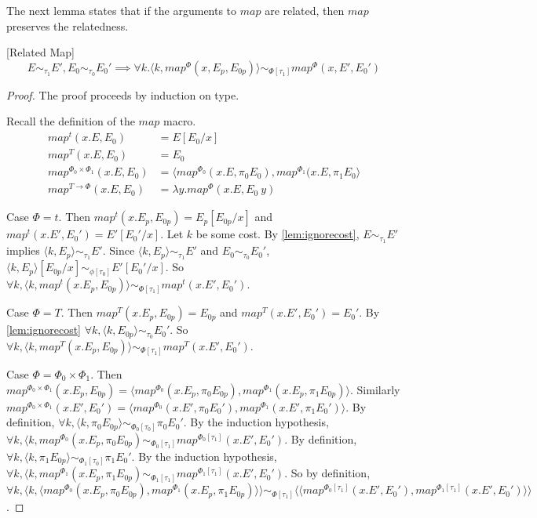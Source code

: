 The next lemma states that if the arguments to $map$ are related, then $map$ preserves the relatedness.
\begin{lemma}
  \label{lem:relatedmap}[Related Map]
  \[ E \sim_{\tau_1} E', E_0 \sim_{\tau_0} E_0' \implies \forall k. \langle k, map^\Phi(x, E_p, E_{0p})\rangle \sim_{\Phi[\tau_1]} map^\Phi(x, E', E_0') \]
\end{lemma}
\begin{proof}
  The proof proceeds by induction on type.

  Recall the definition of the $map$ macro.
  \begin{align*}
    map^t(x.E, E_0) &= E[E_0/x]                                                                                       \\
    map^T(x.E, E_0) &= E_0                                                                                            \\ 
    map^{\Phi_0 \times \Phi_1}(x.E, E_0) &= \langle map^{\Phi_0}(x.E, \pi_0 E_0), map^{\Phi_1}(x.E, \pi_1 E_0 \rangle \\
    map^{T \to \Phi}(x.E, E_0) &= \lambda y.map^\Phi(x.E, E_0\ y)
  \end{align*}

  Case $\Phi = t$.
  Then $map^t(x.E_p, E_{0p}) = E_p[E_{0p}/x]$ and $map^t(x.E', E_0') = E'[E_0'/x]$.
  Let $k$ be some cost.
  By \ref{lem:ignorecost}, $E \sim_{\tau_1} E'$ implies $\langle k, E_p \rangle \sim_{\tau_1} E'$.
  Since $\langle k, E_p \rangle \sim_{\tau_1} E'$ and $E_0 \sim_{\tau_0} E_0'$, $\langle k, E_p \rangle [E_{0p}/x] \sim_{\phi[\tau_0]} E'[E_0'/x]$.
  So $\forall k, \langle k, map^t(x.E_p, E_{0p}) \rangle \sim_{\Phi[\tau_1]} map^t(x.E', E_0')$.

  Case $\Phi = T$.
  Then $map^T(x.E_p, E_{0p}) = E_{0p}$ and $map^T(x.E', E_0') = E_0'$.
  By \ref{lem:ignorecost} $\forall k, \langle k, E_{0p} \rangle \sim_{\tau_0} E_0'$.
  So $\forall k, \langle k, map^T(x.E_p, E_{0p}) \rangle \sim_{\Phi[\tau_1]} map^T(x.E', E_0')$.

  Case $\Phi = \Phi_0 \times \Phi_1$.
  Then $map^{\Phi_0 \times \Phi_1}(x. E_p, E_{0p}) = \langle map^{\Phi_0}(x. E_p, \pi_0 E_{0p}), map^{\Phi_1}(x. E_p, \pi_1 E_{0p}) \rangle$.
  Similarly $map^{\Phi_0 \times \Phi_1}(x. E', E_0') = \langle map^{\Phi_0}(x. E', \pi_0 E_0'), map^{\Phi_1}(x. E', \pi_1 E_0') \rangle$.
  By definition, $\forall k, \langle k, \pi_0 E_{0p} \rangle \sim_{\Phi_0[\tau_0]} \pi_0 E_0'$.
  By the induction hypothesis, $\forall k, \langle k, map^{\Phi_0}(x. E_p, \pi_0 E_{0p}) \sim_{\Phi_0[\tau_1]} map^{\Phi_0[\tau_1]}(x. E', E_0')$.
  By definition, $\forall k, \langle k, \pi_1 E_{0p} \rangle \sim_{\Phi_1[\tau_0]} \pi_1 E_0'$.
  By the induction hypothesis, $\forall k, \langle k, map^{\Phi_1}(x. E_p, \pi_1 E_{0p}) \sim_{\Phi_1[\tau_1]} map^{\Phi_1[\tau_1]}(x. E', E_0')$.
  So by definition, $\forall k, \langle k, \langle map^{\Phi_0}(x. E_p, \pi_0 E_{0p}), map^{\Phi_1}(x. E_p, \pi_1 E_{0p}) \rangle \rangle \sim_{\Phi[\tau_1]} \langle \langle map^{\Phi_0[\tau_1]}(x. E', E_0'), map^{\Phi_1[\tau_1]}(x. E', E_0') \rangle \rangle$.


\end{proof}
